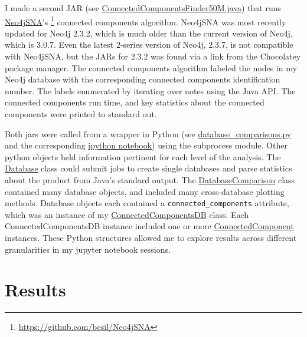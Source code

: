 \documentclass[12pt]{article}
\begin{document}
I made a second JAR (see \href{https://github.com/JanetMatsen/Neo4j_meta4/blob/master/data_mining_Neo4j_v2_3_2/src/ConnectedComponentsFinder50M.java}{ConnectedComponentsFinder50M.java}) that runs \href{https://github.com/besil/Neo4jSNA}{Neo4jSNA}'s \footnote{\url{https://github.com/besil/Neo4jSNA}} connected components algorithm.
Neo4jSNA was most recently updated for Neo4j 2.3.2, which is much older than the current version of Neo4j, which is 3.0.7. 
Even the latest 2-series version of Neo4j, 2.3.7, is not compatible with Neo4jSNA, but the JARs for 2.3.2 was found via a link from the Chocolatey package manager.
The connected components algorithm labeled the nodes in my Neo4j database with the corresponding connected components identification number.
The labels enumerated by iterating over notes using the Java API.
The connected components run time, and key statistics about the connected components were printed to standard out. 

Both jars were called from a wrapper in Python (see \href{https://github.com/JanetMatsen/Neo4j_meta4/blob/master/code/database_comparisons.py}{database\_comparisons.py} and the corresponding \href{https://github.com/JanetMatsen/Neo4j_meta4/blob/master/jupyter/build_graphs_and_find_connected_components_50M.ipynb}{ipython notebook}) using the subprocess module.
Other python objects held information pertinent for each level of the analysis.  
The \href{https://github.com/JanetMatsen/Neo4j_meta4/blob/master/code/database_comparisons.py}{Database} class could submit jobs to create single databases and parse statistics about the product from Java's standard output.
The \href{https://github.com/JanetMatsen/Neo4j_meta4/blob/master/code/database_comparisons.py}{DatabaseComparison} class contained many database objects, and included many cross-database plotting methods.
Database objects each contained a \texttt{connected\_components} attribute, which was an instance of my \href{https://github.com/JanetMatsen/Neo4j_meta4/blob/master/code/connected_component.py}{ConnectedComponentsDB} class.
Each ConnectedComponentsDB instance included one or more \href{https://github.com/JanetMatsen/Neo4j_meta4/blob/master/code/connected_component.py}{ConnectedComponent} instances.
These Python structures allowed me to explore results across different granularities in my jupyter notebook sessions.

\section{Results}  
\end{document}
